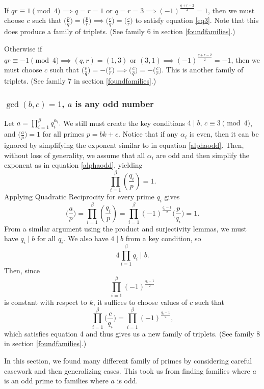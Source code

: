 \documentclass{article}
\newcommand{\al}{\alpha}
\newcommand{\qrB}[2]{\Big( \frac{#1}{#2}\Big)}
\newcommand{\qrbg}[2]{\bigg( \frac{#1}{#2}\bigg)}
\newcommand{\qrn}[2]{\left( \frac{#1}{#2}\right)}
\begin{document}
If $qr \equiv 1 \pmod 4 \implies q=r=1\text{ or } q=r=3 \implies (-1)^{\frac{q+r-2}{2}}=1$, then we must choose $c$ such that $\qrB{p}{q}=\qrB{p}{r} \implies \qrB{c}{q}=\qrB{c}{r}$ to satisfy equation \ref{eq3}. Note that this does produce a family of triplets. (See family 6 in section \ref{foundfamilies}.)

Otherwise if $qr \equiv -1 \pmod 4 \implies (q,r)=(1,3)\text{ or } (3,1) \implies (-1)^{\frac{q+r-2}{2}}=-1$, then we must choose $c$ such that $\qrB{p}{q}=-\qrB{p}{r} \implies \qrB{c}{q}=-\qrB{c}{r}$. This is another family of triplets. (See family 7 in section \ref{foundfamilies}.)

\subsubsection{$\gcd(b,c)=1$, $a$ is any odd number}
Let $a=\displaystyle\prod_{i=1}^{\beta} q_{i}^{\al_i}.$
We still must create the key conditions $4 \mid b, \hspace{2pt} c \equiv 3 \pmod 4$, and $\qrB{a}{p} =1$ for all primes $p = bk+c$.
Notice that if any $\al_i$ is even, then it can be ignored by simplifying the exponent similar to in equation \ref{alphaodd}. Then, without loss of generality, we assume that all $\al_i$ are odd and then simplify the exponent as in equation \ref{alphaodd}, yielding
\[\prod_{i=1}^{\beta}\qrn{q_i}{p} = 1.\]
Applying Quadratic Reciprocity for every prime $q_i$ gives
\begin{equation}\qrbg{a}{p}=\prod_{i=1}^{\beta}\qrn{q_i}{p} = \prod_{i=1}^{\beta} (-1)^{\frac{q_i-1}{2}}\qrbg{p}{q_i}=1.\end{equation}
From a similar argument using the product and surjectivity lemmas, we must have $q_i \mid b$ for all $q_i$. We also have $4\mid b$ from a key condition, so \[4 \prod_{i=1}^{\beta} q_i \mid b.\]
Then, since \[\prod_{i=1}^{\beta} (-1)^{\frac{q_i-1}{2}}\] is constant with respect to $k$, it suffices to choose values of $c$ such that
\[\prod_{i=1}^{\beta}\qrbg{c}{q_i}=\prod_{i=1}^{\beta} (-1)^{\frac{q_i-1}{2}},\] which satisfies equation 4 and thus gives us a new family of triplets. (See family 8 in section \ref{foundfamilies}.)

In this section, we found many different family of primes by considering careful casework and then generalizing cases. This took us from finding families where $a$ is an odd prime to families where $a$ is odd.
\newpage
\end{document}
